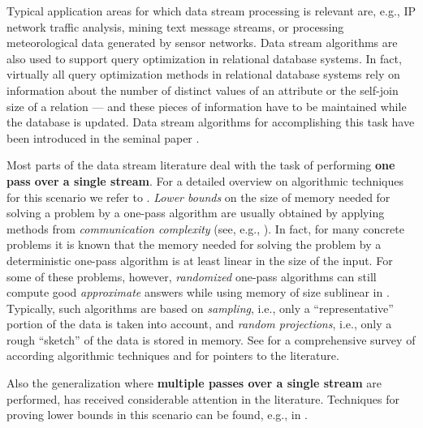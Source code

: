 \documentclass[proceedings]{stacs}
\theoremstyle{plain}\newtheorem{satz}[thm]{Satz}
\theoremstyle{definition}\newtheorem{crucial}[thm]{Crucial Definition}
\begin{document}
Typical application areas for which
data stream processing is relevant are, e.g., 
IP network traffic analysis, mining text message streams, or processing
meteorological data generated by sensor networks.
Data stream algorithms are also used to support query optimization
in relational database systems.
In fact, virtually all query optimization methods in 
relational database systems rely on information about
the number of distinct values of an attribute or the self-join size of a relation 
--- and these pieces of information have to be maintained while the database is updated. 
Data stream algorithms for accomplishing this task have been introduced in the seminal
paper \cite{alomatsze99}.



Most parts of the data stream literature deal with the task of performing
\textbf{one pass over a single stream}. For a detailed overview
on algorithmic techniques for this scenario we refer to \cite{Muthukrishnan-DataStream-Algos}.
 \emph{Lower bounds} on the size of  memory needed for solving a problem by a 
one-pass algorithm are usually obtained by applying methods from 
\emph{communication complexity} 
(see, e.g., \cite{alomatsze99,henragraj99}).
In fact, for many concrete problems it is known that the memory needed 
for solving the problem by a deterministic one-pass algorithm is at 
least linear in the size  of the input.
For some of these problems, however,
\emph{randomized} one-pass algorithms can still compute good \emph{approximate} answers 
while using memory of size sublinear in .
Typically, such algorithms are based on \emph{sampling}, 
i.e., only a ``representative'' portion of the data is taken into account, 
and \emph{random projections}, i.e., only a rough ``sketch'' of the data is stored in memory.
See \cite{Muthukrishnan-DataStream-Algos,ChristianSohler-Survey} for a comprehensive survey 
of according algorithmic techniques and for pointers to the literature.

Also the generalization where \textbf{multiple passes over a single stream} are performed, 
has received considerable attention in the literature. 
Techniques for proving lower bounds in this scenario can be found, 
e.g., in 
\cite{henragraj99,GuhaMcGregor-ICALP08,DBLP:journals/dcg/ChanC07,DBLP:conf/focs/GalG07,munpat80}.
\end{document}
